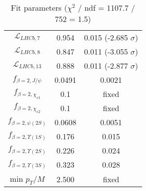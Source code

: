 \begin{table}[h!]
\begin{tabular}{c|c|c}
$\mathcal L_{LHCb,7}$ & 0.954 & 0.015 (-2.685 $\sigma$) \\
$\mathcal L_{LHCb,8}$ & 0.847 & 0.011 (-3.055 $\sigma$) \\
$\mathcal L_{LHCb,13}$ & 0.888 & 0.011 (-2.877 $\sigma$) \\
$f_{\beta=2,J/\psi}$ & 0.0491 & 0.0021 \\
$f_{\beta=2,\chi_{c1}}$ & 0.1 & fixed \\
$f_{\beta=2,\chi_{c2}}$ & 0.1 & fixed \\
$f_{\beta=2,\psi(2S)}$ & 0.0608 & 0.0051 \\
$f_{\beta=2,\Upsilon(1S)}$ & 0.176 & 0.015 \\
$f_{\beta=2,\Upsilon(2S)}$ & 0.226 & 0.024 \\
$f_{\beta=2,\Upsilon(3S)}$ & 0.323 & 0.028 \\
min $p_T/M$ & 2.500 & fixed \\
\end{tabular}
\caption{Fit parameters ($\chi^2$ / ndf = 1107.7 / 752 = 1.5)}
\end{table}
